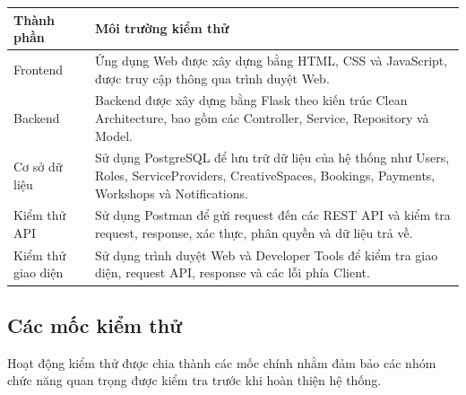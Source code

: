 \begin{longtable}{|>{\raggedright\arraybackslash}p{}|
		>{\raggedright\arraybackslash}p{}|}
	\hline
	\textbf{Thành phần} & \textbf{Môi trường kiểm thử} \\
	\hline
	
	Frontend &
	Ứng dụng Web được xây dựng bằng HTML, CSS và JavaScript, được truy cập thông qua trình duyệt Web. \\
	\hline
	
	Backend &
	Backend được xây dựng bằng Flask theo kiến trúc Clean Architecture, bao gồm các Controller, Service, Repository và Model. \\
	\hline
	
	Cơ sở dữ liệu &
	Sử dụng PostgreSQL để lưu trữ dữ liệu của hệ thống như Users, Roles, ServiceProviders, CreativeSpaces, Bookings, Payments, Workshops và Notifications. \\
	\hline
	
	Kiểm thử API &
	Sử dụng Postman để gửi request đến các REST API và kiểm tra request, response, xác thực, phân quyền và dữ liệu trả về. \\
	\hline
	
	Kiểm thử giao diện &
	Sử dụng trình duyệt Web và Developer Tools để kiểm tra giao diện, request API, response và các lỗi phía Client. \\
	\hline
	
\end{longtable}

\subsection{Các mốc kiểm thử}

Hoạt động kiểm thử được chia thành các mốc chính nhằm đảm bảo các nhóm chức năng quan trọng được kiểm tra trước khi hoàn thiện hệ thống.

